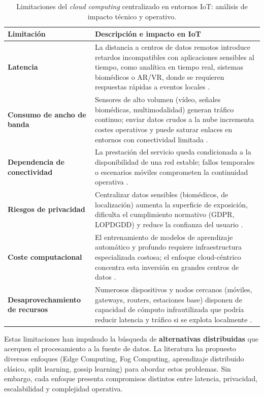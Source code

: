 \documentclass{report}
\begin{document}
\begin{table}[H]
\centering
\small
\caption{Limitaciones del \textit{cloud computing} centralizado en entornos IoT: análisis de impacto técnico y operativo.}
\label{tab:cloud_limitaciones}
\renewcommand{\arraystretch}{1.3}
\begin{tabular}{p{3.2cm} p{9.2cm}}
\toprule
\textbf{Limitación} & \textbf{Descripción e impacto en IoT} \\
\midrule
\textbf{Latencia} & 
La distancia a centros de datos remotos introduce retardos incompatibles con aplicaciones sensibles al tiempo, como analítica en tiempo real, sistemas biomédicos o AR/VR, donde se requieren respuestas rápidas a eventos locales \cite{shi2016edge,satyanarayanan2017emergence}. \\
\midrule
\textbf{Consumo de ancho de banda} & 
Sensores de alto volumen (vídeo, señales biomédicas, multimodalidad) generan tráfico continuo; enviar datos crudos a la nube incrementa costes operativos y puede saturar enlaces en entornos con conectividad limitada \cite{shi2016edge,naha2018fog,varghese2016challenges}. \\
\midrule
\textbf{Dependencia de conectividad} & 
La prestación del servicio queda condicionada a la disponibilidad de una red estable; fallos temporales o escenarios móviles comprometen la continuidad operativa \cite{satyanarayanan2017emergence,naha2018fog}. \\
\midrule
\textbf{Riesgos de privacidad} & 
Centralizar datos sensibles (biomédicos, de localización) aumenta la superficie de exposición, dificulta el cumplimiento normativo (GDPR, LOPDGDD) y reduce la confianza del usuario \cite{shi2016edge,varghese2016challenges}. \\
\midrule
\textbf{Coste computacional} & 
El entrenamiento de modelos de aprendizaje automático y profundo requiere infraestructura especializada costosa; el enfoque cloud-céntrico concentra esta inversión en grandes centros de datos \cite{varghese2016challenges}. \\
\midrule
\textbf{Desaprovechamiento de recursos} & 
Numerosos dispositivos y nodos cercanos (móviles, gateways, routers, estaciones base) disponen de capacidad de cómputo infrautilizada que podría reducir latencia y tráfico si se explota localmente \cite{shi2016edge}. \\
\bottomrule
\end{tabular}
\end{table}


Estas limitaciones han impulsado la búsqueda de \textbf{alternativas distribuidas} que acerquen el procesamiento a la fuente de datos. La literatura ha propuesto diversos enfoques (Edge Computing, Fog Computing, aprendizaje distribuido clásico, split learning, gossip learning) para abordar estos problemas. Sin embargo, cada enfoque presenta compromisos distintos entre latencia, privacidad, escalabilidad y complejidad operativa.
\end{document}
